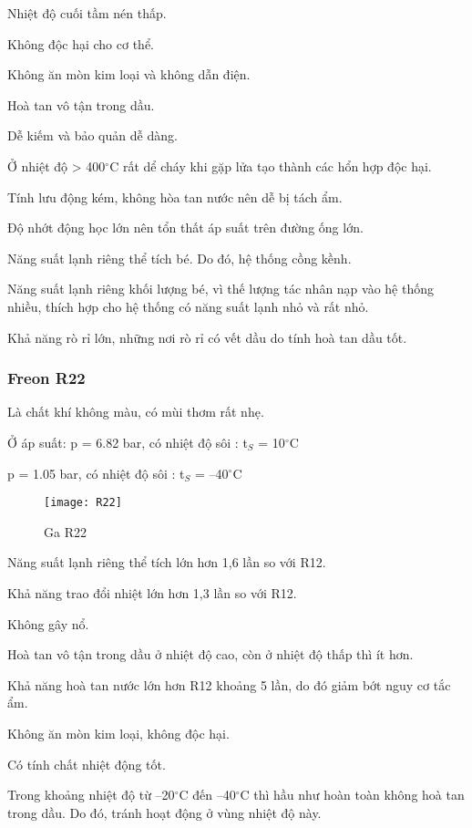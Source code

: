 \begin{table}[H]
Nhiệt độ cuối tầm nén thấp.

Không độc hại cho cơ thể.

Không ăn mòn kim loại và không dẫn điện.

Hoà tan vô tận trong dầu.

Dễ kiếm và bảo quản dễ dàng.

Ở nhiệt độ > 400$^{\circ}$C rất dể cháy khi gặp lửa tạo thành các hổn hợp độc hại.

Tính lưu động kém, không hòa tan nước nên dễ bị tách ẩm.

Độ nhớt động học lớn nên tổn thất áp suất trên đường ống lớn.

Năng suất lạnh riêng thể tích bé. Do đó, hệ thống cồng kềnh.

Năng suất lạnh riêng khối lượng bé, vì thế lượng tác nhân nạp vào hệ thống nhiều, thích hợp cho hệ thống có năng suất lạnh nhỏ và rất nhỏ.

Khả năng rò rỉ lớn, những nơi rò rỉ có vết dầu do tính hoà tan dầu tốt.

\subsubsection{Freon R22}
Là chất khí không màu, có mùi thơm rất nhẹ.

Ở áp suất: 
\hspace{1cm}
p = 6.82 bar, có nhiệt độ sôi : t$_{S}$ = 10$^{\circ}$C

\hspace{2.95cm}
p = 1.05 bar, có nhiệt độ sôi : t$_{S}$ = –40$^{\circ}$C
\begin{figure}[H]
	\centering
	\texttt{[image: R22]}
	\caption{Ga R22}
\end{figure}

Năng suất lạnh riêng thể tích lớn hơn 1,6 lần so với R12.

Khả năng trao đổi nhiệt lớn hơn 1,3 lần so với R12.

Không gây nổ.

Hoà tan vô tận trong dầu ở nhiệt độ cao, còn ở nhiệt độ thấp thì ít hơn.

Khả năng hoà tan nước lớn hơn R12 khoảng 5 lần, do đó giảm bớt nguy cơ tắc ẩm.

Không ăn mòn kim loại, không độc hại.

Có tính chất nhiệt động tốt.

Trong khoảng nhiệt độ từ –20$^{\circ}$C đến –40$^{\circ}$C thì hầu như hoàn toàn không hoà tan trong dầu. Do đó, tránh hoạt động ở vùng nhiệt độ này.


\end{table}
